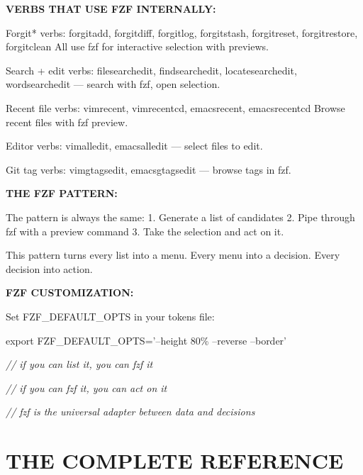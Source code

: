 \documentclass[11pt,a4paper,twoside]{book}
\begin{document}
\vspace{12pt}
{\bfseries\color{neonyellow} VERBS THAT USE FZF INTERNALLY:}\vspace{4pt}

Forgit* verbs: forgitadd, forgitdiff, forgitlog, forgitstash, forgitreset, forgitrestore, forgitclean All use fzf for interactive selection with previews.

Search + edit verbs: filesearchedit, findsearchedit, locatesearchedit, wordsearchedit — search with fzf, open selection.

Recent file verbs: vimrecent, vimrecentcd, emacsrecent, emacsrecentcd Browse recent files with fzf preview.

Editor verbs: vimalledit, emacsalledit — select files to edit.

Git tag verbs: vimgtagsedit, emacsgtagsedit — browse tags in fzf.


\vspace{12pt}
{\bfseries\color{neonyellow} THE FZF PATTERN:}\vspace{4pt}

The pattern is always the same: 1. Generate a list of candidates 2. Pipe through fzf with a preview command 3. Take the selection and act on it.

This pattern turns every list into a menu. Every menu into a decision. Every decision into action.


\vspace{12pt}
{\bfseries\color{neonyellow} FZF CUSTOMIZATION:}\vspace{4pt}

Set FZF\_DEFAULT\_OPTS in your tokens file:

\begin{codebox}
\color{neongreen}export FZF\_DEFAULT\_OPTS='--height 80\% --reverse --border'\\
\end{codebox}

{\small\itshape\color{dimtext} // if you can list it, you can fzf it}

{\small\itshape\color{dimtext} // if you can fzf it, you can act on it}

{\small\itshape\color{dimtext} // fzf is the universal adapter between data and decisions}


\vspace{16pt}


\chapter{THE COMPLETE REFERENCE}
\end{document}
